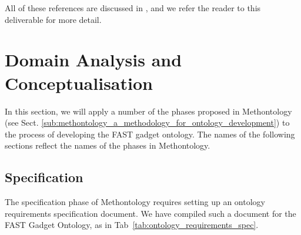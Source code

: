 \documentclass{article}
\begin{document}
All of these references are discussed in \cite{urmetzer2010fast_state_of_the_art}, and we refer the reader to this deliverable for more detail.

\clearpage
\section{Domain Analysis and Conceptualisation} %
\label{sec:domain_analysis}

In this section, we will apply a number of the phases proposed in Methontology (see Sect. \ref{sub:methontology_a_methodology_for_ontology_development}) to the process of developing the FAST gadget ontology. The names of the following sections reflect the names of the phases in Methontology.

\subsection{Specification} %
\label{sub:specification}

The specification phase of Methontology requires setting up an ontology requirements specification document. We have compiled such a document for the FAST Gadget Ontology, as in Tab~\ref{tab:ontology_requirements_spec}.
\end{document}
